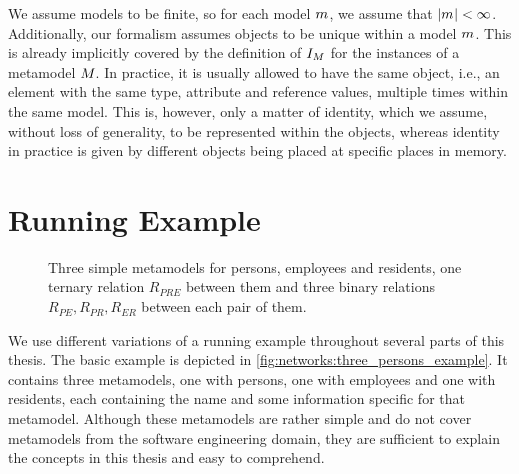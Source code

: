 We assume models to be finite, so for each model $m_{}$, we assume that $|m_{}| < \infty$.
Additionally, our formalism assumes objects to be unique within a model $m_{}$. 
This is already implicitly covered by the definition of $I_{M}$ for the instances of a metamodel $M_{}$. 
In practice, it is usually allowed to have the same object, i.e., an element with the same type, attribute and reference values, multiple times within the same model. 
This is, however, only a matter of identity, which we assume, without loss of generality, to be represented within the objects, whereas identity in practice is given by different objects being placed at specific places in memory.





\section{Running Example}
\label{chap:networks:example}


\begin{figure}
    \centering
    
    \caption[Three metamodels with exemplary consistency relations]{Three simple metamodels for persons, employees and residents, one ternary relation $R_{PRE}$ between them and three binary relations $R_{PE}, R_{PR}, R_{ER}$ between each pair of them.}
    \label{fig:networks:three_persons_example}
\end{figure}

We use different variations of a running example throughout several parts of this thesis.
The basic example is depicted in \autoref{fig:networks:three_persons_example}.
It contains three metamodels, one with persons, one with employees and one with residents, each containing the name and some information specific for that metamodel.
Although these metamodels are rather simple and do not cover metamodels from the software engineering domain, they are sufficient to explain the concepts in this thesis and easy to comprehend.

